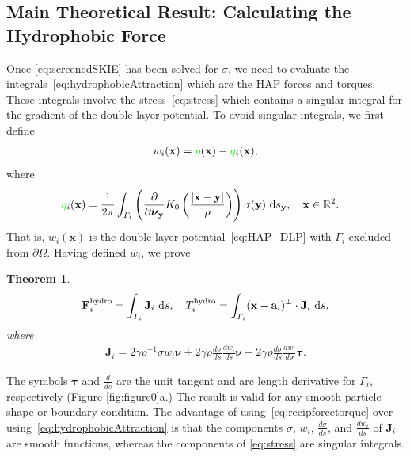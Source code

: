 \documentclass[lineno]{jfm}
\newtheorem{theorem}{Theorem}
\renewcommand{\aa}{\mathbf{a}}
\newcommand{\bd}{\partial}
\newcommand{\FF}{\mathbf{F}}
\newcommand{\JJ}{\mathbf{J}}
\newcommand{\nnu}{\boldsymbol{\nu}}
\newcommand{\ttau}{\boldsymbol{\tau}}
\newcommand{\xx}{\mathbf{x}}
\newcommand{\yy}{\mathbf{y}}
\newcommand{\pderiv}[2]{\frac{\partial #1}{\partial #2}}
\newcommand{\ReviewerTwo}[1]{\textcolor{green}{#1}}
\begin{document}
\subsection{Main Theoretical Result: Calculating the Hydrophobic Force}
\label{subsec:calculating_force}
Once \eqref{eq:screenedSKIE} has been solved for $\sigma$, we need to
evaluate the integrals~\eqref{eq:hydrophobicAttraction} which are the
HAP forces and torques. These integrals involve the
stress~\eqref{eq:stress} which contains a singular integral for the
gradient of the double-layer potential. To avoid singular integrals, we
first define
\begin{align}
  \label{eq:uidef}
  w_i(\xx) = \ReviewerTwo{\eta}(\xx) - \ReviewerTwo{\eta}_i(\xx),
\end{align}
where
\begin{align}
  \ReviewerTwo{\eta}_i(\xx) &= \frac{1}{2\pi} \int_{\Gamma_i} \left(\pderiv{}{\nnu_\yy}
    K_0 \left(\frac{|\xx - \yy|}{\rho}\right)\right) 
    \sigma(\yy) \, \dif s_\yy, \quad \xx \in \mathbb{R}^2.
\end{align}
That is, $w_i(\xx)$ is the double-layer potential~\eqref{eq:HAP_DLP}
with $\Gamma_i$ excluded from $\bd\Omega$. Having defined $w_i$, we prove
\begin{theorem}
\begin{align}
  \label{eq:recipforcetorque}
  \FF_i^{\mathrm{hydro}} = \int_{\Gamma_i} \JJ_i \,\dif s,\quad
  T_i^{\mathrm{hydro}}    = \int_{\Gamma_i} 
    (\xx - \aa_i)^{\perp} \cdot \JJ_i  \,\dif s,
\end{align}
where
\begin{align}
  \label{eq:jumpstress1}
  \JJ_{i} = 2\gamma\rho^{-1} \sigma w_i \nnu + 
    2\gamma\rho \frac{d\sigma}{ds} \frac{dw_i}{ds} \nnu -
    2\gamma\rho \frac{d\sigma}{ds} \frac{dw_i}{d\nnu} \ttau.
\end{align}
\end{theorem}
The symbols $\ttau$ and $\frac{d}{ds}$ are the unit tangent and arc
length derivative for $\Gamma_i$, respectively (Figure
\ref{fig:figure0}a.) The result is valid for any smooth particle shape
or boundary condition. The advantage of
using~\eqref{eq:recipforcetorque} over
using~\eqref{eq:hydrophobicAttraction} is that the components $\sigma$,
$w_i$, $\frac{d\sigma}{ds}$, and $\frac{dw_i}{ds}$ of $\JJ_i$ are smooth
functions, whereas the components of \eqref{eq:stress} are singular
integrals. 
\end{document}
